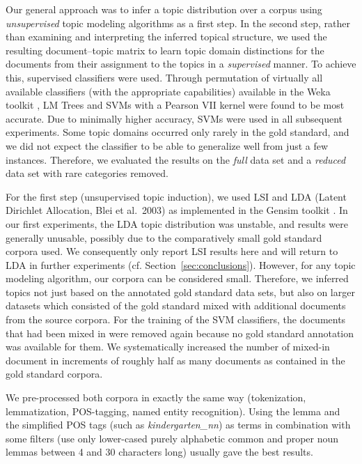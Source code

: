 \documentclass[11pt]{article}
\begin{document}
Our general approach was to infer a topic distribution over a corpus using \textit{unsupervised} topic modeling algorithms as a first step.
In the second step, rather than examining and interpreting the inferred topical structure, we used the resulting document--topic matrix to learn topic domain distinctions for the documents from their assignment to the topics in a \textit{supervised} manner.
To achieve this, supervised classifiers were used.
Through permutation of virtually all available classifiers (with the appropriate capabilities) available in the Weka toolkit \cite{HallWitten2011}, LM Trees \cite{LandwehrEa2005} and SVMs with a Pearson VII kernel \cite{UstunEa2006} were found to be most accurate.
Due to minimally higher accuracy, SVMs were used in all subsequent experiments.
Some topic domains occurred only rarely in the gold standard, and we did not expect the classifier to be able to generalize well from just a few instances.
Therefore, we evaluated the results on the \textit{full} data set and a \textit{reduced} data set with rare categories removed.

For the first step (unsupervised topic induction), we used LSI and LDA (Latent Dirichlet Allocation, Blei et al.\ 2003\nocite{BleiEa2003}) as implemented in the Gensim toolkit \cite{RehurekSojka2010}.
In our first experiments, the LDA topic distribution was unstable, and results were generally unusable, possibly due to the comparatively small gold standard corpora used.
We consequently only report LSI results here and will return to LDA in further experiments (cf. Section~\ref{sec:conclusions}).
However, for any topic modeling algorithm, our corpora can be considered small.
Therefore, we inferred topics not just based on the annotated gold standard data sets, but also on larger datasets which consisted of the gold standard mixed with additional documents from the source corpora.
For the training of the SVM classifiers, the documents that had been mixed in were removed again because no gold standard annotation was available for them.
We systematically increased the number of mixed-in document in increments of roughly half as many documents as contained in the gold standard corpora.

We pre-processed both corpora in exactly the same way (tokenization, lemmatization, POS-tagging, named entity recognition).
Using the lemma and the simplified POS tags (such as \textit{kindergarten\_nn}) as terms in combination with some filters (use only lower-cased purely alphabetic common and proper noun lemmas between 4 and 30 characters long) usually gave the best results.
\end{document}
